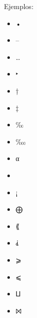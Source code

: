 Ejemplos:
\begin{itemize}
	\item •
	\item –	
	\item …
	\item ‣
	\item †
	\item ‡
	\item ‰
	\item ‱
	\item α
	\item  
	\item ¡
	\item ⨁
	\item ⟪
	\item ⸘
	\item ⩾
	\item ⩽
	\item ⨿
	\item ⨝
\end{itemize}